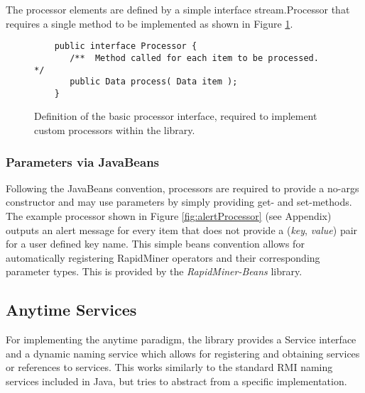 The processor elements are defined by a simple interface {\ttfamily
  stream.Processor} that requires a single method to be implemented as
shown in Figure \ref{fig:processorInterface}.

\begin{figure}
{\footnotesize
  \begin{lstlisting}
    public interface Processor {
       /**  Method called for each item to be processed.   */
       public Data process( Data item );
    }
  \end{lstlisting}
}
  \caption{\label{fig:processorInterface}Definition of the basic
    processor interface, required to implement custom processors
    within the \streams library.}
\end{figure}
%

\subsubsection*{Parameters via JavaBeans}
Following the JavaBeans convention, processors are required to provide
a no-args constructor and may use parameters by simply providing
{\ttfamily get}- and {\ttfamily set}-methods. The example processor
shown in Figure \ref{fig:alertProcessor} (see Appendix) outputs an
alert message for every item that does not provide a ({\em key},{\em
  value}) pair for a user defined key name.  This simple beans
convention allows for automatically registering RapidMiner operators
and their corresponding parameter types. This is provided by the {\em
  RapidMiner-Beans} library.


\subsection{Anytime Services}
For implementing the anytime paradigm, the \streams library provides a
{\ttfamily Service} interface and a dynamic naming service which
allows for registering and obtaining services or references to
services. This works similarly to the standard RMI naming services
included in Java, but tries to abstract from a specific
implementation.

